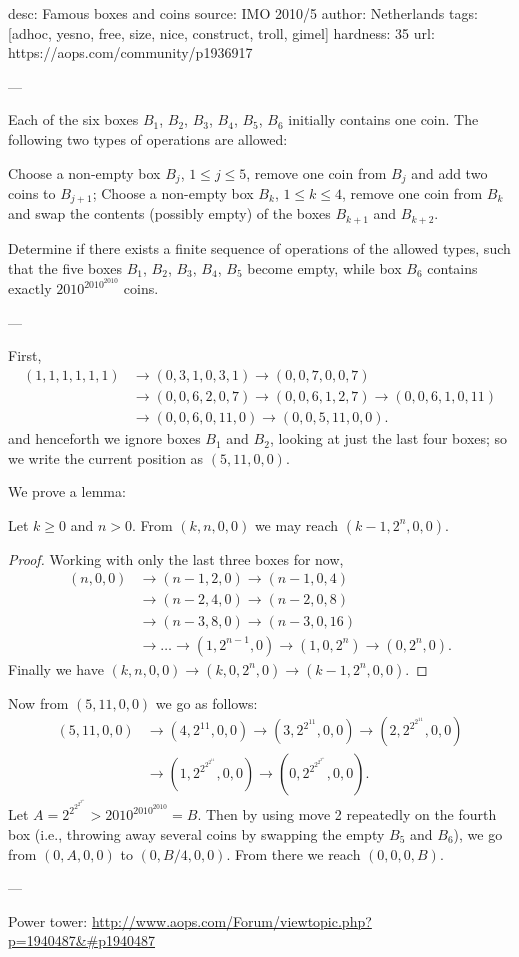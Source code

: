 desc: Famous boxes and coins
source:  IMO 2010/5
author: Netherlands
tags:  [adhoc, yesno, free, size, nice, construct, troll, gimel]
hardness: 35
url: https://aops.com/community/p1936917

---

Each of the six boxes $B_1$, $B_2$, $B_3$, $B_4$, $B_5$, $B_6$
initially contains one coin.
The following two types of operations are allowed:
\begin{enumerate}
  \ii Choose a non-empty box $B_j$, $1\leq j \leq 5$,
  remove one coin from $B_j$ and add two coins to $B_{j+1}$;
  \ii Choose a non-empty box $B_k$, $1\leq k \leq 4$,
  remove one coin from $B_k$ and swap the contents
  (possibly empty) of the boxes $B_{k+1}$ and $B_{k+2}$.
\end{enumerate}
Determine if there exists a finite sequence of operations of the allowed types,
such that the five boxes $B_1$, $B_2$, $B_3$, $B_4$, $B_5$ become empty,
while box $B_6$ contains exactly $2010^{2010^{2010}}$ coins.


---

First,
\begin{align*}
  (1,1,1,1,1,1) &\to (0,3,1,0,3,1) \to (0,0,7,0,0,7) \\
  &\to (0,0,6,2,0,7) \to (0,0,6,1,2,7) \to (0,0,6,1,0,11) \\
  &\to (0,0,6,0,11,0) \to (0,0,5,11,0,0).
\end{align*}
and henceforth we ignore boxes $B_1$ and $B_2$,
looking at just the last four boxes;
so we write the current position as $(5,11,0,0)$.

We prove a lemma:
\begin{claim*}
  Let $k \ge 0$ and $n > 0$.
  From $(k,n,0,0)$ we may reach $(k-1,2^n,0,0)$.
\end{claim*}
\begin{proof}
  Working with only the last three boxes for now,
  \begin{align*}
    (n,0,0) &\to (n-1, 2, 0) \to (n-1, 0, 4) \\
    &\to (n-2, 4, 0) \to (n-2, 0, 8) \\
    &\to (n-3, 8, 0) \to (n-3, 0, 16) \\
    &\to \dots \to (1, 2^{n-1}, 0) \to (1, 0, 2^n) \to (0, 2^n, 0).
  \end{align*}
  Finally we have $(k,n,0,0) \to (k,0,2^n,0) \to (k-1,2^n, 0,0)$.
\end{proof}

Now from $(5,11,0,0)$ we go as follows:
\begin{align*} (5,11,0,0) &\to (4, 2^{11}, 0, 0)
  \to \left(3, 2^{2^{11}}, 0, 0\right)
  \to \left(2, 2^{2^{2^{11}}}, 0, 0\right) \\
  &\to \left( 1, 2^{2^{2^{2^{11}}}}, 0, 0\right)
  \to \left(0, 2^{2^{2^{2^{2^{11}}}}}, 0, 0\right).
\end{align*}
Let $A = 2^{2^{2^{2^{2^{11}}}}} > 2010^{2010^{2010}} = B$.
Then by using move 2 repeatedly on the fourth box
(i.e., throwing away several coins by swapping the empty $B_5$ and $B_6$),
we go from $(0,A,0,0)$ to $(0,B/4,0,0)$.
From there we reach $(0,0,0,B)$.

---



Power tower:
\url{http://www.aops.com/Forum/viewtopic.php?p=1940487&#p1940487}
